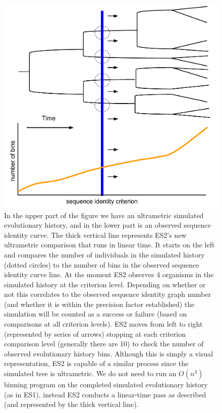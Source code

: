 \begin{figure}[h!]
\centering
\includegraphics[scale=0.55]{images/ES2-Illustration}
\caption[Illustration of the new ES2 algorithm.]{In the upper part of the figure we have an ultrametric simulated evolutionary history, and in the lower part is an observed sequence identity curve. The thick vertical line represents ES2's new ultrametric comparison that runs in linear time. It starts on the left and compares the number of individuals in the simulated history (dotted circles) to the number of bins in the observed sequence identity curve line. At the moment ES2 observes 4 organisms in the simulated history at the criterion level. Depending on whether or not this correlates to the observed sequence identity graph number (and whether it is within the precision factor established) the simulation will be counted as a success or failure (based on comparisons at all criterion levels). ES2 moves from left to right (represented by series of arrows) stopping at each criterion comparison level (generally there are 10) to check the number of observed evolutionary history bins. Although this is simply a visual representation, ES2 is capable of a similar process since the simulated tree is ultrametric. We do not need to run an $O(n^3)$ binning program on the completed simulated evolutionary history (as in ES1), instead ES2 conducts a linear-time pass as described (and represented by the thick vertical line).}
\label{fig:ES2Explain}
\end{figure}

